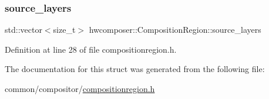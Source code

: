 \mbox{\label{structhwcomposer_1_1CompositionRegion_a4cb8206ae9aa2ffd872d3cb5fda6d39e}} 
\subsubsection{\texorpdfstring{source\+\_\+layers}{source\_layers}}
{\footnotesize\ttfamily std\+::vector$<$size\+\_\+t$>$ hwcomposer\+::\+Composition\+Region\+::source\+\_\+layers}



Definition at line 28 of file compositionregion.\+h.



The documentation for this struct was generated from the following file\+:\begin{DoxyCompactItemize}
\item 
common/compositor/\mbox{\hyperlink{compositionregion_8h}{compositionregion.\+h}}\end{DoxyCompactItemize}
